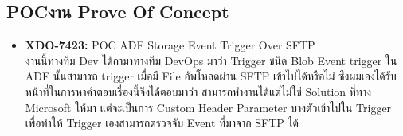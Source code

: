 \clearpage
\subsection{\ifenglish POC\else งาน Prove Of Concept\fi}
\begin{itemize}
      \item \textbf{XDO-7423:} POC ADF Storage Event Trigger Over SFTP\\
            งานนี้ทางทีม Dev ได้ถามาทางทีม DevOps มาว่า Trigger ชนิด Blob Event trigger ใน ADF นั้นสามารถ trigger เมื่อมี File อัพโหลดผ่าน SFTP เข้าไปได้หรือไม่ ซึงผมเองได้รับหน้าที่ในการหาคำตอบเรื่องนี้จีงได้ตอบมาว่า สามารถทำงานได้แต่ไม่ใช่ Solution ที่ทาง Microsoft ให้มา แต่จะเป็นการ Custom Header Parameter บางตัวเข้าไปใน Trigger เพื่อทำให้ Trigger เองสามารถตรวจจับ Event ที่มาจาก SFTP ได้


\end{itemize}
